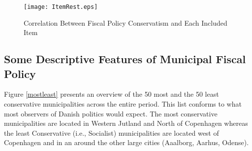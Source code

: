 \documentclass[a4paper,12pt]{article}
\begin{document}
\begin{figure}[htbp]
	\centering 
	
	\texttt{[image: ItemRest.eps]}
	\caption{Correlation Between Fiscal Policy Conservatism and Each Included Item}
	\label{fig:ItemRest}
	
\end{figure}



\clearpage

\subsection{Some Descriptive Features of Municipal Fiscal Policy} \label{descriptives}

\setcounter{table}{0}
\setcounter{figure}{0}




Figure \ref{mostleast} presents an overview of the 50 most and the 50 least conservative municipalities across the entire period. This list conforms to what most observers of Danish politics would expect. The most conservative municipalities are located in Western Jutland and North of Copenhagen whereas the least Conservative (i.e., Socialist) municipalities are located west of Copenhagen and in an around the other large cities (Aaalborg, Aarhus, Odense). 
\end{document}

